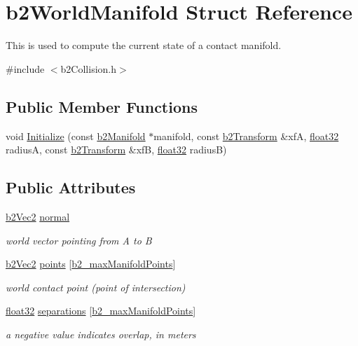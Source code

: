 \hypertarget{structb2_world_manifold}{}\section{b2\+World\+Manifold Struct Reference}
\label{structb2_world_manifold}


This is used to compute the current state of a contact manifold.  




{\ttfamily \#include $<$b2\+Collision.\+h$>$}

\subsection*{Public Member Functions}
\begin{DoxyCompactItemize}
\item 
void \mbox{\hyperlink{structb2_world_manifold_a896dd7e7d4d6f6a5bc69e19fbd6871bd}{Initialize}} (const \mbox{\hyperlink{structb2_manifold}{b2\+Manifold}} $\ast$manifold, const \mbox{\hyperlink{structb2_transform}{b2\+Transform}} \&xfA, \mbox{\hyperlink{b2_settings_8h_aacdc525d6f7bddb3ae95d5c311bd06a1}{float32}} radiusA, const \mbox{\hyperlink{structb2_transform}{b2\+Transform}} \&xfB, \mbox{\hyperlink{b2_settings_8h_aacdc525d6f7bddb3ae95d5c311bd06a1}{float32}} radiusB)
\end{DoxyCompactItemize}
\subsection*{Public Attributes}
\begin{DoxyCompactItemize}
\item 
\mbox{\hyperlink{structb2_vec2}{b2\+Vec2}} \mbox{\hyperlink{structb2_world_manifold_acf8de61b73d9784d16f7d0e824ce44bf}{normal}}
\begin{DoxyCompactList}\small\item\em world vector pointing from A to B \end{DoxyCompactList}\item 
\mbox{\hyperlink{structb2_vec2}{b2\+Vec2}} \mbox{\hyperlink{structb2_world_manifold_af15e84b90f102c0ac433be2d63604021}{points}} \mbox{[}\mbox{\hyperlink{b2_settings_8h_aa5f44cc9edf711433dea2b2ec94f3c42}{b2\+\_\+max\+Manifold\+Points}}\mbox{]}
\begin{DoxyCompactList}\small\item\em world contact point (point of intersection) \end{DoxyCompactList}\item 
\mbox{\hyperlink{b2_settings_8h_aacdc525d6f7bddb3ae95d5c311bd06a1}{float32}} \mbox{\hyperlink{structb2_world_manifold_ac545e60a52d219d53ef1de3e0cad2d84}{separations}} \mbox{[}\mbox{\hyperlink{b2_settings_8h_aa5f44cc9edf711433dea2b2ec94f3c42}{b2\+\_\+max\+Manifold\+Points}}\mbox{]}
\begin{DoxyCompactList}\small\item\em a negative value indicates overlap, in meters \end{DoxyCompactList}\end{DoxyCompactItemize}


